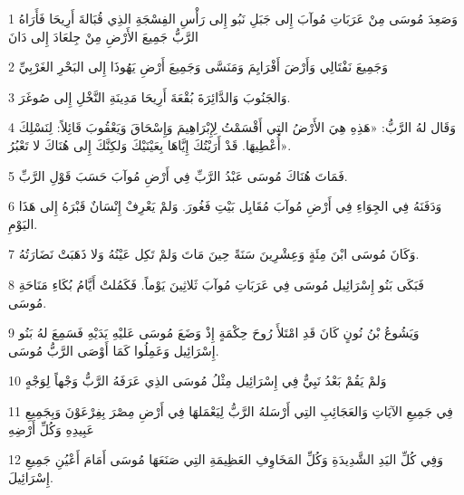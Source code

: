 \par 1 وَصَعِدَ مُوسَى مِنْ عَرَبَاتِ مُوآبَ إِلى جَبَلِ نَبُو إِلى رَأْسِ الفِسْجَةِ الذِي قُبَالةَ أَرِيحَا فَأَرَاهُ الرَّبُّ جَمِيعَ الأَرْضِ مِنْ جِلعَادَ إِلى دَانَ
\par 2 وَجَمِيعَ نَفْتَالِي وَأَرْضَ أَفْرَايِمَ وَمَنَسَّى وَجَمِيعَ أَرْضِ يَهُوذَا إِلى البَحْرِ الغَرْبِيِّ
\par 3 وَالجَنُوبَ وَالدَّائِرَةَ بُقْعَةَ أَرِيحَا مَدِينَةِ النَّخْلِ إِلى صُوغَرَ.
\par 4 وَقَال لهُ الرَّبُّ: «هَذِهِ هِيَ الأَرْضُ التِي أَقْسَمْتُ لِإِبْرَاهِيمَ وَإِسْحَاقَ وَيَعْقُوبَ قَائِلاً: لِنَسْلِكَ أُعْطِيهَا. قَدْ أَرَيْتُكَ إِيَّاهَا بِعَيْنَيْكَ وَلكِنَّكَ إِلى هُنَاكَ لا تَعْبُرُ».
\par 5 فَمَاتَ هُنَاكَ مُوسَى عَبْدُ الرَّبِّ فِي أَرْضِ مُوآبَ حَسَبَ قَوْلِ الرَّبِّ.
\par 6 وَدَفَنَهُ فِي الجِوَاءِ فِي أَرْضِ مُوآبَ مُقَابِل بَيْتِ فَغُورَ. وَلمْ يَعْرِفْ إِنْسَانٌ قَبْرَهُ إِلى هَذَا اليَوْمِ.
\par 7 وَكَانَ مُوسَى ابْنَ مِئَةٍ وَعِشْرِينَ سَنَةً حِينَ مَاتَ وَلمْ تَكِل عَيْنُهُ وَلا ذَهَبَتْ نَضَارَتُهُ.
\par 8 فَبَكَى بَنُو إِسْرَائِيل مُوسَى فِي عَرَبَاتِ مُوآبَ ثَلاثِينَ يَوْماً. فَكَمُلتْ أَيَّامُ بُكَاءِ مَنَاحَةِ مُوسَى.
\par 9 وَيَشُوعُ بْنُ نُونٍ كَانَ قَدِ امْتَلأَ رُوحَ حِكْمَةٍ إِذْ وَضَعَ مُوسَى عَليْهِ يَدَيْهِ فَسَمِعَ لهُ بَنُو إِسْرَائِيل وَعَمِلُوا كَمَا أَوْصَى الرَّبُّ مُوسَى.
\par 10 وَلمْ يَقُمْ بَعْدُ نَبِيٌّ فِي إِسْرَائِيل مِثْلُ مُوسَى الذِي عَرَفَهُ الرَّبُّ وَجْهاً لِوَجْهٍ
\par 11 فِي جَمِيعِ الآيَاتِ وَالعَجَائِبِ التِي أَرْسَلهُ الرَّبُّ لِيَعْمَلهَا فِي أَرْضِ مِصْرَ بِفِرْعَوْنَ وَبِجَمِيعِ عَبِيدِهِ وَكُلِّ أَرْضِهِ
\par 12 وَفِي كُلِّ اليَدِ الشَّدِيدَةِ وَكُلِّ المَخَاوِفِ العَظِيمَةِ التِي صَنَعَهَا مُوسَى أَمَامَ أَعْيُنِ جَمِيعِ إِسْرَائِيلَ.


